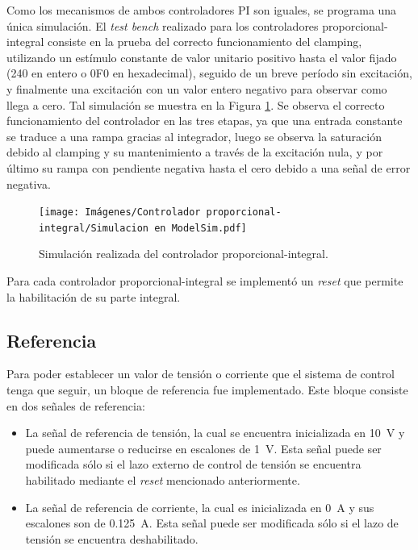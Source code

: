 Como los mecanismos de ambos controladores PI son iguales, se programa una única simulación. El \emph{test bench} realizado para los controladores proporcional-integral consiste en la prueba del correcto funcionamiento del clamping, utilizando un estímulo constante de valor unitario positivo hasta el valor fijado (240 en entero o 0F0 en hexadecimal), seguido de un breve período sin excitación, y finalmente una excitación con un valor entero negativo para observar como llega a cero. Tal simulación se muestra en la Figura \ref{simulacion-pi}. Se observa el correcto funcionamiento del controlador en las tres etapas, ya que una entrada constante se traduce a una rampa gracias al integrador, luego se observa la saturación debido al clamping y su mantenimiento a través de la excitación nula, y por último su rampa con pendiente negativa hasta el cero debido a una señal de error negativa.

\begin{figure}[hbt!]
    \centering
    \texttt{[image: Imágenes/Controlador proporcional-integral/Simulacion en ModelSim.pdf]}    
    \caption{Simulación realizada del controlador proporcional-integral.}
    \label{simulacion-pi}
\end{figure} 

Para cada controlador proporcional-integral se implementó un \emph{reset} que permite la habilitación de su parte integral. 

\subsection{Referencia}

Para poder establecer un valor de tensión o corriente que el sistema de control tenga que seguir, un bloque de referencia fue implementado. Este bloque consiste en dos señales de referencia: 

\begin{itemize}
    \item La señal de referencia de tensión, la cual se encuentra inicializada en \SI{10}{\volt} y puede aumentarse o reducirse en escalones de \SI{1}{\volt}. Esta señal puede ser modificada sólo si el lazo externo de control de tensión se encuentra habilitado mediante el \emph{reset} mencionado anteriormente.
    \item La señal de referencia de corriente, la cual es inicializada en \SI{0}{\ampere} y sus escalones son de \SI{0.125}{\ampere}. Esta señal puede ser modificada sólo si el lazo de tensión se encuentra deshabilitado.
\end{itemize}

